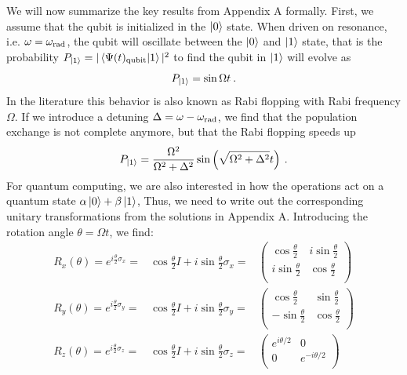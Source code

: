 \documentclass{../lab}
\begin{document}
We will now summarize the key results from Appendix A formally. First, we  assume that the qubit is initialized in the $\ket{0}$ state. When driven on resonance, i.e. $\omega=\omega_{\rm rad}$, the qubit will oscillate between the $\ket{0}$ and $\ket{1}$ state, that is the probability $P_{\ket{1}}=|\braket{\Psi(t)_{\rm qubit}}{1}|^2$ to find the qubit in $\ket{1}$ will evolve as
\begin{equation}
    P_{\ket{1}} = \sin\Omega t\:.
\end{equation}
In the literature this behavior is also known 
as Rabi flopping with Rabi frequency $\Omega$. If we introduce a detuning $\Delta=\omega-\omega_{\rm rad}$, we find that the population exchange is not complete anymore, but that the Rabi flopping speeds up
\begin{equation}
    P_{\ket{1}} = \frac{\Omega^2}{\Omega^2+\Delta^2}\sin\left(\sqrt{\Omega^2+\Delta^2} t\right) \:.
\end{equation}
For quantum computing, we are also interested in how the operations act on a quantum state $\alpha \ket{0}+\beta \ket{1}$, Thus,  we need to write out the corresponding unitary transformations from the solutions in Appendix A. Introducing the rotation angle $\theta=\Omega t$, we find: 
\begin{eqnarray}\label{eq:rotationx}
R_x(\theta)=e^{i\frac{\theta}{2}\sigma_x}=&\cos\frac{\theta}{2}I +
i\sin\frac{\theta}{2}\sigma_x=&\left( \begin{array}{cc}
\cos\frac{\theta}{2} & i\sin\frac{\theta}{2}\\ i\sin\frac{\theta}{2} &
\cos\frac{\theta}{2}\\
\end{array}\right)\\
R_y(\theta)=e^{i\frac{\theta}{2}\sigma_y}=&\cos\frac{\theta}{2}I + \label{eq:rotationy}
i\sin\frac{\theta}{2}\sigma_y=&\left( \begin{array}{cc}
\cos\frac{\theta}{2} & \sin\frac{\theta}{2}\\ -\sin\frac{\theta}{2} &
\cos\frac{\theta}{2}\\
\end{array}\right)\\
R_z(\theta)=e^{i\frac{\theta}{2}\sigma_z}=&\cos\frac{\theta}{2}I + \label{eq:rotationz}
i\sin\frac{\theta}{2}\sigma_z=&\left( \begin{array}{cc}
e^{i\theta/2} & 0\\0 & e^{-i\theta/2} \\
\end{array}\right)
\end{eqnarray}
\end{document}
